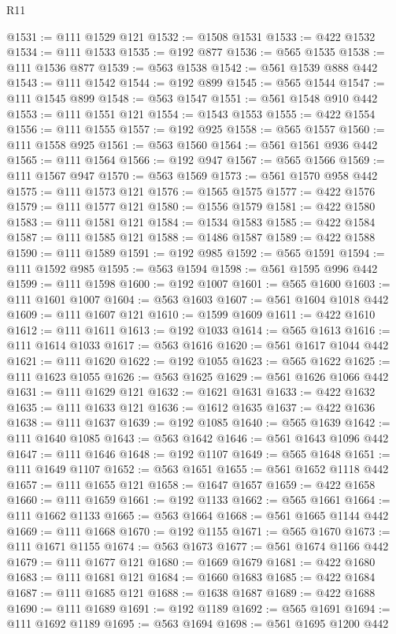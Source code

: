 \begin{lexlean}{R11}
\begin{coremodule}
{{{{{{{{{{{{{{{{{{{{{{{{{{{{{{{{{{{{{{{{{{{{{{{{{{{{{{{{{{{{{{{{{{{{{{{{{{{{{{{{{{@1531 := @111 @1529 @121
@1532 := @1508 @1531
@1533 := @422 @1532
@1534 := @111 @1533
@1535 := @192 @877
@1536 := @565 @1535
@1538 := @111 @1536 @877
@1539 := @563 @1538
@1542 := @561 @1539 @888 @442
@1543 := @111 @1542
@1544 := @192 @899
@1545 := @565 @1544
@1547 := @111 @1545 @899
@1548 := @563 @1547
@1551 := @561 @1548 @910 @442
@1553 := @111 @1551 @121
@1554 := @1543 @1553
@1555 := @422 @1554
@1556 := @111 @1555
@1557 := @192 @925
@1558 := @565 @1557
@1560 := @111 @1558 @925
@1561 := @563 @1560
@1564 := @561 @1561 @936 @442
@1565 := @111 @1564
@1566 := @192 @947
@1567 := @565 @1566
@1569 := @111 @1567 @947
@1570 := @563 @1569
@1573 := @561 @1570 @958 @442
@1575 := @111 @1573 @121
@1576 := @1565 @1575
@1577 := @422 @1576
@1579 := @111 @1577 @121
@1580 := @1556 @1579
@1581 := @422 @1580
@1583 := @111 @1581 @121
@1584 := @1534 @1583
@1585 := @422 @1584
@1587 := @111 @1585 @121
@1588 := @1486 @1587
@1589 := @422 @1588
@1590 := @111 @1589
@1591 := @192 @985
@1592 := @565 @1591
@1594 := @111 @1592 @985
@1595 := @563 @1594
@1598 := @561 @1595 @996 @442
@1599 := @111 @1598
@1600 := @192 @1007
@1601 := @565 @1600
@1603 := @111 @1601 @1007
@1604 := @563 @1603
@1607 := @561 @1604 @1018 @442
@1609 := @111 @1607 @121
@1610 := @1599 @1609
@1611 := @422 @1610
@1612 := @111 @1611
@1613 := @192 @1033
@1614 := @565 @1613
@1616 := @111 @1614 @1033
@1617 := @563 @1616
@1620 := @561 @1617 @1044 @442
@1621 := @111 @1620
@1622 := @192 @1055
@1623 := @565 @1622
@1625 := @111 @1623 @1055
@1626 := @563 @1625
@1629 := @561 @1626 @1066 @442
@1631 := @111 @1629 @121
@1632 := @1621 @1631
@1633 := @422 @1632
@1635 := @111 @1633 @121
@1636 := @1612 @1635
@1637 := @422 @1636
@1638 := @111 @1637
@1639 := @192 @1085
@1640 := @565 @1639
@1642 := @111 @1640 @1085
@1643 := @563 @1642
@1646 := @561 @1643 @1096 @442
@1647 := @111 @1646
@1648 := @192 @1107
@1649 := @565 @1648
@1651 := @111 @1649 @1107
@1652 := @563 @1651
@1655 := @561 @1652 @1118 @442
@1657 := @111 @1655 @121
@1658 := @1647 @1657
@1659 := @422 @1658
@1660 := @111 @1659
@1661 := @192 @1133
@1662 := @565 @1661
@1664 := @111 @1662 @1133
@1665 := @563 @1664
@1668 := @561 @1665 @1144 @442
@1669 := @111 @1668
@1670 := @192 @1155
@1671 := @565 @1670
@1673 := @111 @1671 @1155
@1674 := @563 @1673
@1677 := @561 @1674 @1166 @442
@1679 := @111 @1677 @121
@1680 := @1669 @1679
@1681 := @422 @1680
@1683 := @111 @1681 @121
@1684 := @1660 @1683
@1685 := @422 @1684
@1687 := @111 @1685 @121
@1688 := @1638 @1687
@1689 := @422 @1688
@1690 := @111 @1689
@1691 := @192 @1189
@1692 := @565 @1691
@1694 := @111 @1692 @1189
@1695 := @563 @1694
@1698 := @561 @1695 @1200 @442
}}}}}}}}}}}}}}}}}}}}}}}}}}}}}}}}}}}}}}}}}}}}}}}}}}}}}}}}}}}}}}}}}}}}}}}}}}}}}}}}}}
\end{coremodule}
\end{lexlean}
